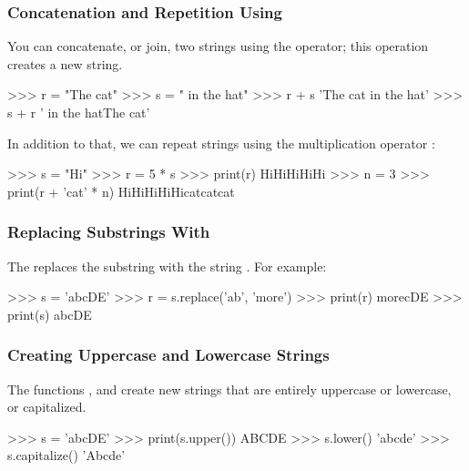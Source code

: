 \documentclass[11pt]{cselabheader}
\begin{document}
\subsubsection{Concatenation and Repetition Using \pythoninline{+, *}}

You can concatenate, or join, two strings using the \pythonindex{+}
operator; this operation creates a new string.

\begin{pyconcode}
>>> r = "The cat"
>>> s = " in the hat"
>>> r + s
'The cat in the hat'
>>> s + r
' in the hatThe cat'

\end{pyconcode}

In addition to that, we can repeat strings using the multiplication operator
\pythonindex{*}:

\begin{pyconcode}
>>> s = "Hi"
>>> r = 5 * s
>>> print(r)
HiHiHiHiHi
>>> n = 3
>>> print(r + 'cat' * n)
HiHiHiHiHicatcatcat

\end{pyconcode}


\subsubsection{Replacing Substrings With }

The  replaces the substring
 with the string .
For example:

\begin{pyconcode}
>>> s = 'abcDE'
>>> r = s.replace('ab', 'more')
>>> print(r)
morecDE
>>> print(s)
abcDE

\end{pyconcode}

\subsubsection{Creating Uppercase and Lowercase Strings}

The functions  , and 
create new strings that are entirely uppercase or lowercase, or capitalized.

\begin{pyconcode}
>>> s = 'abcDE'
>>> print(s.upper())
ABCDE
>>> s.lower()
'abcde'
>>> s.capitalize()
'Abcde'

\end{pyconcode}
\end{document}
